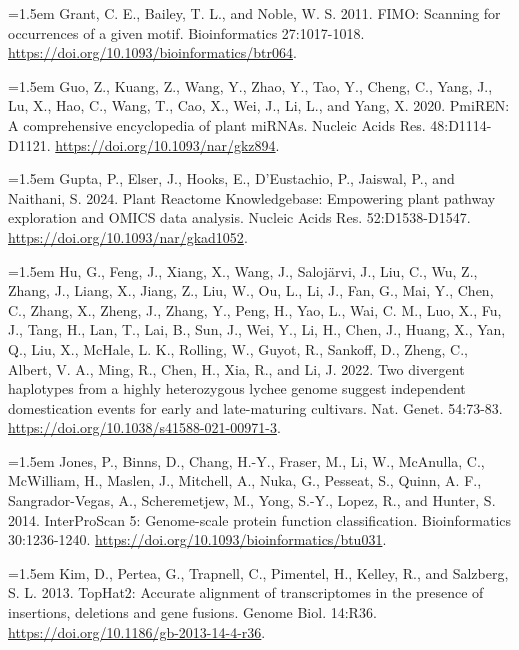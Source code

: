\documentclass[12pt,letterpaper]{article}
\begin{document}
\noindent\hangindent=1.5em Grant, C. E., Bailey, T. L., and Noble, W. S. 2011. FIMO: Scanning for occurrences of a given motif. Bioinformatics 27:1017-1018. \url{https://doi.org/10.1093/bioinformatics/btr064}.\par

\noindent\hangindent=1.5em Guo, Z., Kuang, Z., Wang, Y., Zhao, Y., Tao, Y., Cheng, C., Yang, J., Lu, X., Hao, C., Wang, T., Cao, X., Wei, J., Li, L., and Yang, X. 2020. PmiREN: A comprehensive encyclopedia of plant miRNAs. Nucleic Acids Res. 48:D1114-D1121. \url{https://doi.org/10.1093/nar/gkz894}.\par

\noindent\hangindent=1.5em Gupta, P., Elser, J., Hooks, E., D'Eustachio, P., Jaiswal, P., and Naithani, S. 2024. Plant Reactome Knowledgebase: Empowering plant pathway exploration and OMICS data analysis. Nucleic Acids Res. 52:D1538-D1547. \url{https://doi.org/10.1093/nar/gkad1052}.\par

\noindent\hangindent=1.5em Hu, G., Feng, J., Xiang, X., Wang, J., Salojärvi, J., Liu, C., Wu, Z., Zhang, J., Liang, X., Jiang, Z., Liu, W., Ou, L., Li, J., Fan, G., Mai, Y., Chen, C., Zhang, X., Zheng, J., Zhang, Y., Peng, H., Yao, L., Wai, C. M., Luo, X., Fu, J., Tang, H., Lan, T., Lai, B., Sun, J., Wei, Y., Li, H., Chen, J., Huang, X., Yan, Q., Liu, X., McHale, L. K., Rolling, W., Guyot, R., Sankoff, D., Zheng, C., Albert, V. A., Ming, R., Chen, H., Xia, R., and Li, J. 2022. Two divergent haplotypes from a highly heterozygous lychee genome suggest independent domestication events for early and late-maturing cultivars. Nat. Genet. 54:73-83. \url{https://doi.org/10.1038/s41588-021-00971-3}.\par

\noindent\hangindent=1.5em Jones, P., Binns, D., Chang, H.-Y., Fraser, M., Li, W., McAnulla, C., McWilliam, H., Maslen, J., Mitchell, A., Nuka, G., Pesseat, S., Quinn, A. F., Sangrador-Vegas, A., Scheremetjew, M., Yong, S.-Y., Lopez, R., and Hunter, S. 2014. InterProScan 5: Genome-scale protein function classification. Bioinformatics 30:1236-1240. \url{https://doi.org/10.1093/bioinformatics/btu031}.\par

\noindent\hangindent=1.5em Kim, D., Pertea, G., Trapnell, C., Pimentel, H., Kelley, R., and Salzberg, S. L. 2013. TopHat2: Accurate alignment of transcriptomes in the presence of insertions, deletions and gene fusions. Genome Biol. 14:R36. \url{https://doi.org/10.1186/gb-2013-14-4-r36}.\par
\end{document}
